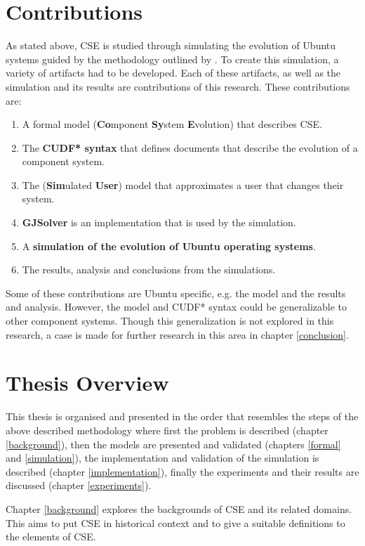 \section{Contributions}
As stated above, CSE is studied through simulating the evolution of Ubuntu systems guided by the methodology outlined by \cite{Law2005}.
To create this simulation, a variety of artifacts had to be developed.
Each of these artifacts, as well as the simulation and its results are contributions of this research. 
These contributions are:
\begin{enumerate}
  \item A formal model \textbf{\modelname} (\textbf{Co}mponent \textbf{Sy}stem \textbf{E}volution) that describes CSE. 
  \item The \textbf{CUDF* syntax} that defines documents that describe the evolution of a component system.
  \item The \textbf{\usermodel} (\textbf{Sim}ulated \textbf{User}) model that approximates a user that changes their system.
  \item \textbf{GJSolver} is an implementation that is used by the simulation.
  \item A \textbf{simulation of the evolution of Ubuntu operating systems}.
  \item The results, analysis and conclusions from the simulations.
\end{enumerate}

Some of these contributions are Ubuntu specific, e.g. the \usermodel model and the results and analysis.
However, the \modelname model and CUDF* syntax could be generalizable to other component systems.
Though this generalization is not explored in this research, a case is made for further research in this area in chapter \ref{conclusion}.

\section{Thesis Overview}
This thesis is organised and presented in the order that resembles the steps of the above described methodology
where first the problem is described (chapter \ref{background}), then the models are presented and validated (chapters \ref{formal} and \ref{simulation}),
the implementation and validation of the simulation is described (chapter \ref{implementation}), finally the experiments and their results are discussed (chapter \ref{experiments}).  

Chapter \ref{background} explores the backgrounds of CSE and its related domains.
This aims to put CSE in historical context and to give a suitable definitions to the elements of CSE.

